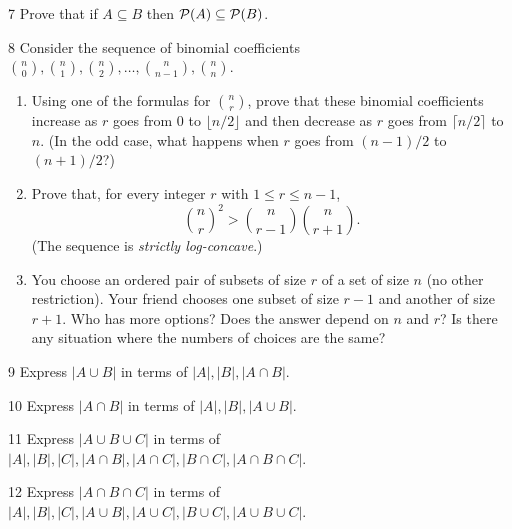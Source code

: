 \begin{exercise}{7}
    Prove that if $A\subseteq B$ then $\mathcal{P}(A)\subseteq\mathcal{P}(B)$.
\end{exercise}

\begin{exercise}{8}
    Consider the sequence of binomial coefficients
    $\binom n0,\binom n1,\binom n2,\dots,\binom n{n-1},\binom nn$.
    \begin{enumerate}[label=(\alph*)]
        \item Using one of the formulas for $\binom nr$, prove that these
              binomial coefficients increase as $r$ goes from $0$ to
              $\lfloor n/2\rfloor$ and then decrease as $r$ goes from
              $\lceil n/2\rceil$ to $n$. (In the odd case, what happens when $r$
              goes from $(n-1)/2$ to $(n+1)/2$?)
        \item Prove that, for every integer $r$ with $1\le r\le n-1$,
              \[
                  \binom nr^2 > \binom n{r-1}\binom n{r+1}.
              \]
              (The sequence is \emph{strictly log-concave}.)
        \item You choose an ordered pair of subsets of size $r$ of a set of size
              $n$ (no other restriction). Your friend chooses one subset of size
              $r-1$ and another of size $r+1$. Who has more options? Does the
              answer depend on $n$ and $r$? Is there any situation where the
              numbers of choices are the same?
    \end{enumerate}
\end{exercise}

\begin{exercise}{9}
    Express $|A\cup B|$ in terms of $|A|,|B|,|A\cap B|$.
\end{exercise}

\begin{exercise}{10}
    Express $|A\cap B|$ in terms of $|A|,|B|,|A\cup B|$.
\end{exercise}

\begin{exercise}{11}
    Express $|A\cup B\cup C|$ in terms of
    $|A|,|B|,|C|,|A\cap B|,|A\cap C|,|B\cap C|,|A\cap B\cap C|$.
\end{exercise}

\begin{exercise}{12}
    Express $|A\cap B\cap C|$ in terms of
    $|A|,|B|,|C|,|A\cup B|,|A\cup C|,|B\cup C|,|A\cup B\cup C|$.
\end{exercise}

